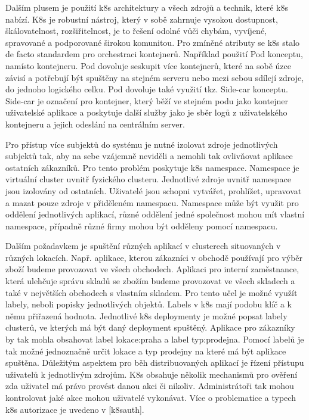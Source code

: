      Dalším plusem je použití k8s architektury a všech zdrojů a technik, které k8s nabízí. K8s je robustní nástroj, který v sobě zahrnuje vysokou dostupnost, škálovatelnost, rozšiřitelnost, je to řešení odolné vůči chybám, vyvíjené, spravované a podporované širokou komunitou. Pro zmíněné atributy se k8s stalo de facto standardem pro orchestraci kontejnerů. Například použití Pod konceptu, namísto kontejneru. Pod dovoluje seskupit více kontejnerů, které na sobě úzce závisí a potřebují být spuštěny na stejném serveru nebo mezi sebou sdílejí zdroje, do jednoho logického celku. Pod dovoluje také využití tkz. Side-car konceptu. Side-car je označení pro kontejner, který běží ve stejném podu jako kontejner uživatelské aplikace a poskytuje další služby jako je sběr logů z uživatelského kontejneru a jejich odeslání na centrálním server. \par
     Pro přístup více subjektů do systému je nutné izolovat zdroje jednotlivých subjektů tak, aby na sebe vzájemně neviděli a nemohli tak ovlivňovat aplikace ostatních zákazníků. Pro tento problém poskytuje k8s namespace. Namespace je virtuální cluster uvnitř fyzického clusteru. Jednotlivé zdroje uvnitř namespace jsou izolovány od ostatních. Uživatelé jsou schopni vytvářet, prohlížet, upravovat a mazat pouze zdroje v přiděleném namespacu. Namespace může být využit pro oddělení jednotlivých aplikací, různé oddělení jedné společnost mohou mít vlastní namespace, případně různé firmy mohou být odděleny pomocí namespacu. \par
     Dalším požadavkem je spuštění různých aplikací v clusterech situovaných v různých lokacích. Např. aplikace, kterou zákazníci v obchodě používají pro výběr zboží budeme provozovat ve všech obchodech. Aplikaci pro interní zaměstnance, která ulehčuje správu skladů se zbožím budeme provozovat ve všech skladech a také v největších obchodech s vlastním skladem. Pro tento učel je možné využít labely, neboli popisky jednotlivých objektů. Labels v k8s mají podobu klíč a k němu přiřazená hodnota. Jednotlivé k8s deploymenty je možné popsat labely clusterů, ve kterých má být daný deployment spuštěný. Aplikace pro zákazníky by tak mohla obsahovat label lokace:praha a label typ:prodejna. Pomocí labelů je tak možné jednoznačně určit lokace a typ prodejny na které má být aplikace spuštěna. 
     Důležitým aspektem pro běh distribuovaných aplikací je řízení přístupu uživatelů k jednotlivým zdrojům. K8s obsahuje několik mechanismů pro ověření zda uživatel má právo provést danou akci či nikoliv. Administrátoři tak mohou kontrolovat jaké akce mohou uživatelé vykonávat. Více o problematice a typech k8s autorizace je uvedeno v [k8sauth].

